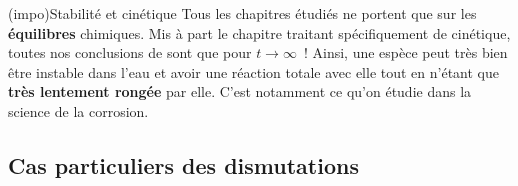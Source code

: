 \documentclass[../../main/main.tex]{subfiles}
\begin{document}
\begin{tcb*}(impo){Stabilité et cinétique}
	Tous les chapitres étudiés ne portent que sur les \textbf{équilibres}
	chimiques. Mis à part le chapitre traitant spécifiquement de cinétique, toutes
	nos conclusions de sont que pour $t \to \infty$~!
	\smallbreak
	Ainsi, une espèce peut très bien être instable dans l'eau et avoir une
	réaction totale avec elle tout en n'étant que \textbf{très lentement rongée}
	par elle. C'est notamment ce qu'on étudie dans la science de la corrosion.
\end{tcb*}

\subsection{Cas particuliers des dismutations}
\end{document}
